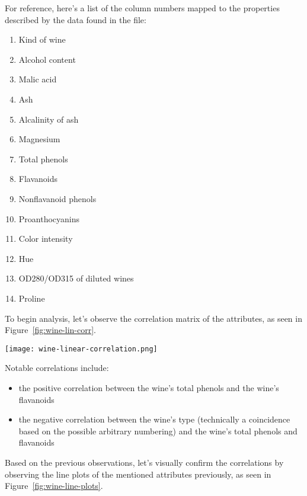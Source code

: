\documentclass[
  coursecode={CISC/CMPE 251},
  assignmentname={Exercise 1},
  studentnumber=20053722,
  name={Bryan Hoang}
]{
  ltxanswer%
}
\begin{document}
\begin{questions}
    \begin{solution}
      For reference, here's a list of the column numbers mapped to the properties described by the data found in the  file:
      \begin{enumerate}[twocol, leftmargin=2.5em]
        \item Kind of wine
        \item Alcohol content
        \item Malic acid
        \item Ash
        \item Alcalinity of ash
        \item Magnesium
        \item Total phenols
        \item Flavanoids
        \item Nonflavanoid phenols
        \item Proanthocyanins
        \item Color intensity
        \item Hue
        \item OD280/OD315 of diluted wines
        \item Proline
      \end{enumerate}

      \newpage

      To begin analysis, let's observe the correlation matrix of the attributes, as seen in Figure~\ref{fig:wine-lin-corr}.

      \begin{answerfigure}
        \captionsetup{type=figure}
        \texttt{[image: wine-linear-correlation.png]}
        \label{fig:wine-lin-corr}
      \end{answerfigure}

      Notable correlations include:
      \begin{itemize}
        \item the positive correlation between the wine's total phenols and the wine's flavanoids
        \item the negative correlation between the wine's type (technically a coincidence based on the possible arbitrary numbering) and the wine's total phenols and flavanoids
      \end{itemize}

      \newpage

      Based on the previous observations, let's visually confirm the correlations by observing the line plots of the mentioned attributes previously, as seen in Figure~\ref{fig:wine-line-plots}.


\end{solution}
\end{questions}
\end{document}

